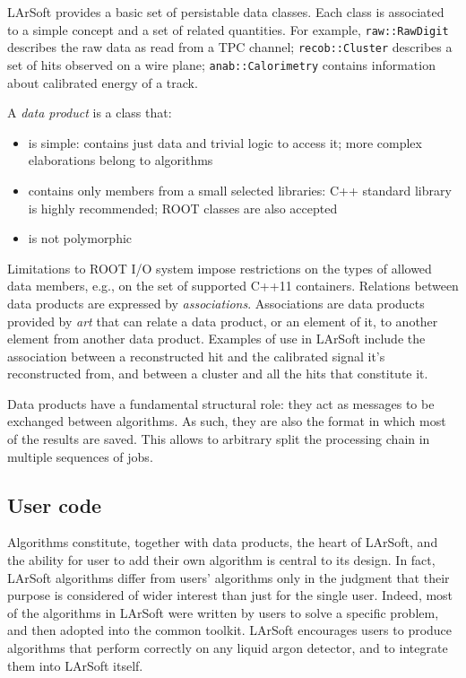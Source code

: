 LArSoft provides a basic set of persistable data classes. Each class is
associated to a simple concept and a set of related quantities. For
example, \texttt{raw::RawDigit} describes the raw data as read from a
TPC channel; \texttt{recob::Cluster} describes a set of hits observed on
a wire plane; \texttt{anab::Calorimetry} contains information about
calibrated energy of a track.

A \emph{data product} is a class that:

\begin{itemize}
\item
  is simple: contains just data and trivial logic to access it; more
  complex elaborations belong to algorithms
\item
  contains only members from a small selected libraries: C++ standard
  library is highly recommended; ROOT classes are also accepted
\item
  is not polymorphic
\end{itemize}

Limitations to ROOT I/O system impose restrictions on the types of
allowed data members, e.g., on the set of supported C++11 containers.
Relations between data products are expressed by \emph{associations}.
Associations are data products provided by \emph{art} that can relate a
data product, or an element of it, to another element from another data
product. Examples of use in LArSoft include the association between a
reconstructed hit and the calibrated signal it's reconstructed from, and
between a cluster and all the hits that constitute it.

Data products have a fundamental structural role: they act as messages
to be exchanged between algorithms. As such, they are also the format in
which most of the results are saved. This allows to arbitrary split the
processing chain in multiple sequences of jobs.

\subsection{User code}\label{user-code}

Algorithms constitute, together with data products, the heart of
LArSoft, and the ability for user to add their own algorithm is central
to its design. In fact, LArSoft algorithms differ from users' algorithms
only in the judgment that their purpose is considered of wider interest
than just for the single user. Indeed, most of the algorithms in LArSoft
were written by users to solve a specific problem, and then adopted into
the common toolkit. LArSoft encourages users to produce algorithms that
perform correctly on any liquid argon detector, and to integrate them
into LArSoft itself.

